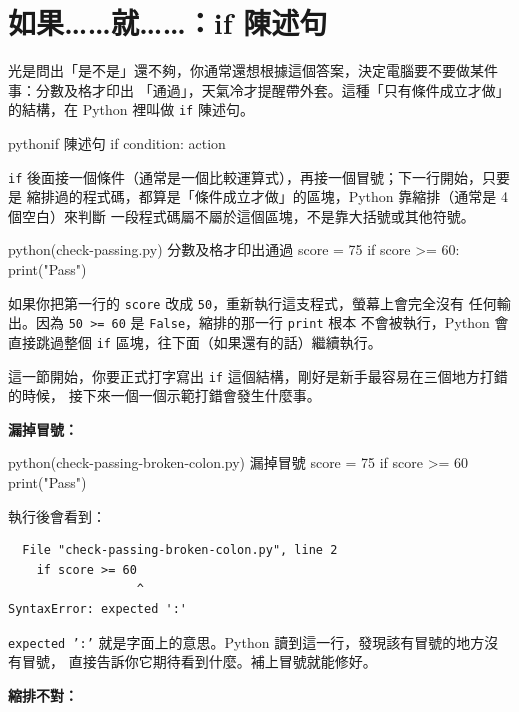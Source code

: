 \section{如果……就……：if 陳述句}
\label{sec:if-basics}

光是問出「是不是」還不夠，你通常還想根據這個答案，決定電腦要不要做某件事：分數及格才印出
「通過」，天氣冷才提醒帶外套。這種「只有條件成立才做」的結構，在 Python 裡叫做
\texttt{if} 陳述句。

\begin{code}{python}{if 陳述句}
if condition:
    action
\end{code}

\texttt{if} 後面接一個條件（通常是一個比較運算式），再接一個冒號；下一行開始，只要是
縮排過的程式碼，都算是「條件成立才做」的區塊，Python 靠縮排（通常是 4 個空白）來判斷
一段程式碼屬不屬於這個區塊，不是靠大括號或其他符號。

\begin{example}{python}{(check-passing.py) 分數及格才印出通過}
score = 75
if score >= 60:
    print("Pass")
\end{example}


如果你把第一行的 \texttt{score} 改成 \texttt{50}，重新執行這支程式，螢幕上會完全沒有
任何輸出。因為 \texttt{50 >= 60} 是 \texttt{False}，縮排的那一行 \texttt{print} 根本
不會被執行，Python 會直接跳過整個 \texttt{if} 區塊，往下面（如果還有的話）繼續執行。

這一節開始，你要正式打字寫出 \texttt{if} 這個結構，剛好是新手最容易在三個地方打錯的時候，
接下來一個一個示範打錯會發生什麼事。

\textbf{漏掉冒號：}

\begin{example}{python}{(check-passing-broken-colon.py) 漏掉冒號}
score = 75
if score >= 60
    print("Pass")
\end{example}

執行後會看到：

\begin{verbatim}
  File "check-passing-broken-colon.py", line 2
    if score >= 60
                  ^
SyntaxError: expected ':'
\end{verbatim}

\texttt{expected ':'} 就是字面上的意思。Python 讀到這一行，發現該有冒號的地方沒有冒號，
直接告訴你它期待看到什麼。補上冒號就能修好。

\textbf{縮排不對：}

